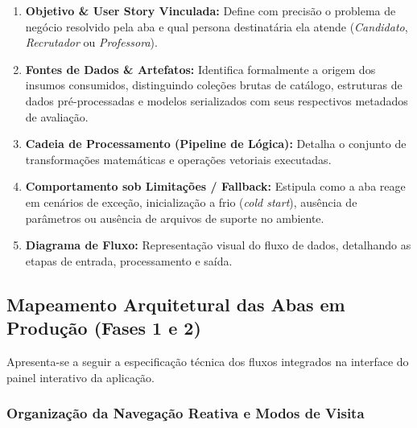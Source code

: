 \begin{enumerate}[label=\textbf{\arabic*.}]
    \item \textbf{Objetivo \& User Story Vinculada:} Define com precisão o problema de negócio resolvido pela aba e qual persona destinatária ela atende (\textit{Candidato}, \textit{Recrutador} ou \textit{Professora}).
    \item \textbf{Fontes de Dados \& Artefatos:} Identifica formalmente a origem dos insumos consumidos, distinguindo coleções brutas de catálogo, estruturas de dados pré-processadas e modelos serializados com seus respectivos metadados de avaliação.
    \item \textbf{Cadeia de Processamento (Pipeline de Lógica):} Detalha o conjunto de transformações matemáticas e operações vetoriais executadas.
    \item \textbf{Comportamento sob Limitações / Fallback:} Estipula como a aba reage em cenários de exceção, inicialização a frio (\textit{cold start}), ausência de parâmetros ou ausência de arquivos de suporte no ambiente.
    \item \textbf{Diagrama de Fluxo:} Representação visual do fluxo de dados, detalhando as etapas de entrada, processamento e saída.
\end{enumerate}

\subsection{Mapeamento Arquitetural das Abas em Produção (Fases 1 e 2)}

Apresenta-se a seguir a especificação técnica dos fluxos integrados na interface do painel interativo da aplicação. 

\subsubsection{Organização da Navegação Reativa e Modos de Visita}

